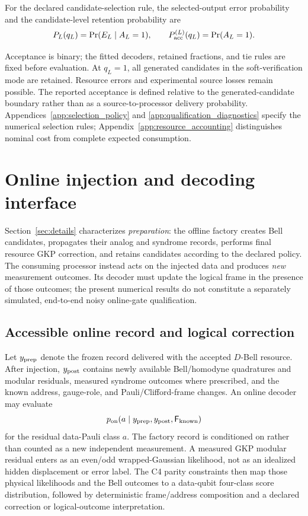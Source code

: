 \documentclass[aps,
prx,
superscriptaddress,
reprint,
longbibliography,
floatfix]{revtex4-2}
\begin{document}
For the declared candidate-selection rule, the selected-output error probability and the candidate-level retention probability are
\begin{equation}
P_L(q_L)=\Pr(E_L\mid A_L=1),
\qquad
P_{\rm acc}^{(L)}(q_L)=\Pr(A_L=1).
\label{eq:soft_information_conditional_error}
\end{equation}

Acceptance is binary; the fitted decoders, retained fractions, and tie rules are fixed before evaluation. At $q_L=1$, all generated candidates in the soft-verification mode are retained. Resource errors and experimental source losses remain possible. The reported acceptance is defined relative to the generated-candidate boundary rather than as a source-to-processor delivery probability. Appendices~\ref{app:selection_policy} and \ref{app:qualification_diagnostics} specify the numerical selection rules; Appendix~\ref{app:resource_accounting} distinguishes nominal cost from complete expected consumption.



\section{Online injection and decoding interface}\label{sec:online_decoder_interface}
Section~\ref{sec:details} characterizes \emph{preparation}: the offline factory creates Bell candidates, propagates their analog and syndrome records, performs final resource GKP correction, and retains candidates according to the declared policy. The consuming processor instead acts on the injected data and produces \emph{new} measurement outcomes. Its decoder must update the logical frame in the presence of those outcomes; the present numerical results do not constitute a separately simulated, end-to-end noisy online-gate qualification.

\subsection{Accessible online record and logical correction}
Let $y_{\rm prep}$ denote the frozen record delivered with the accepted $D$-Bell resource. After injection, $y_{\rm post}$ contains newly available Bell/homodyne quadratures and modular residuals, measured syndrome outcomes where prescribed, and the known address, gauge-role, and Pauli/Clifford-frame changes. An online decoder may evaluate
\begin{equation}
p_{\rm on}(a\mid y_{\rm prep},y_{\rm post},\mathsf F_{\rm known})
\label{eq:online_decoder_conditional_record}
\end{equation}
for the residual data-Pauli class $a$. The factory record is conditioned on rather than counted as a new independent measurement. A measured GKP modular residual enters as an even/odd wrapped-Gaussian likelihood, not as an idealized hidden displacement or error label. The C4 parity constraints then map those physical likelihoods and the Bell outcomes to a data-qubit four-class score distribution, followed by deterministic frame/address composition and a declared correction or logical-outcome interpretation.
\end{document}
